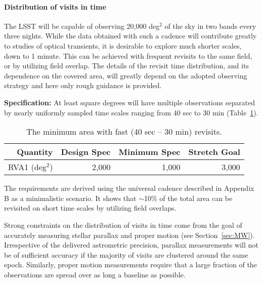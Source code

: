 \paragraph{Distribution of visits in time\\}

The LSST will be capable of observing 20,000 deg$^2$ of the sky in two
bands every three nights. While the data obtained with such a cadence will
contribute greatly to studies of optical transients, it is desirable to
explore much shorter scales, down to 1 minute. This can be achieved with
frequent revisits to the same field, or by utilizing field overlap.  The
details of the revisit time distribution, and its dependence on the covered
area, will greatly depend on the adopted observing strategy and here only
rough guidance is provided.

\textbf{Specification:} At least
square degrees will have multiple observations separated by nearly uniformly
sampled time scales ranging from 40 sec to 30 min (Table~\ref{TfastArea}).

\begin{table}[h]
\begin{tabular}{|r|r|r|r|}
\hline
Quantity            & Design Spec & Minimum Spec & Stretch Goal     \\
\hline
  RVA1  (deg$^2$)   &  2,000      &  1,000       &     3,000        \\
\hline
\end{tabular}
\caption{The minimum area with fast (40 sec -- 30 min) revisits.}
\label{TfastArea}
\end{table}

The requirements are derived using the universal cadence described in
Appendix B as a minimalistic scenario. It shows that $\sim$10\% of the
total area can be revisited on short time scales by utilizing field
overlaps.

Strong constraints on the distribution of visits in time come from the goal
of accurately measuring stellar parallax and proper motion (see Section~\ref{sec:MW}).
Irrespective of the delivered astrometric precision, parallax measurements will
not be of sufficient accuracy if the majority of visits are clustered around
the same epoch. Similarly, proper motion measurements require that a large
fraction of the observations are spread over as long a baseline as possible.


